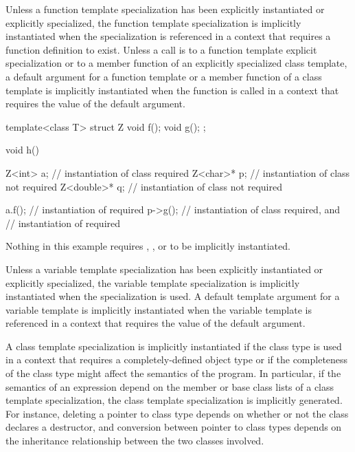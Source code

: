 \pnum
Unless a function template specialization has been explicitly instantiated or
explicitly specialized,
the function template specialization is implicitly instantiated when the
specialization is referenced in a context that requires a function definition
to exist.
Unless a call is to a function template explicit specialization or
to a member function of an explicitly specialized class template,
a default argument for a function template or a member function of a
class template is implicitly instantiated when the function is
called in a context that requires the value of the default argument.

\pnum
\enterexample
\begin{codeblock}
template<class T> struct Z {
  void f();
  void g();
};

void h() {
  Z<int> a;         // instantiation of class  required
  Z<char>* p;       // instantiation of class  not required
  Z<double>* q;     // instantiation of class  not required

  a.f();            // instantiation of  required
  p->g();           // instantiation of class  required, and
                    // instantiation of  required
}
\end{codeblock}

Nothing in this example requires
,
,
or
to be implicitly instantiated.
\exitexample

\pnum
Unless a variable template specialization has been explicitly instantiated or
explicitly specialized, the variable template specialization is implicitly
instantiated when the specialization is used. A default template argument for a
variable template is implicitly instantiated when the variable template is
referenced in a context that requires the value of the default argument.

\pnum
A class template specialization is implicitly instantiated if the
class type is used in a context that requires a completely-defined
object type or if the completeness of the class type might affect the
semantics of the program.
\enternote
In particular, if the semantics of an expression depend on the member
or base class lists of a class template specialization, the class
template specialization is implicitly generated. For instance,
deleting a pointer to class type depends on whether or not the class
declares a destructor, and conversion between pointer to class types
depends on the inheritance relationship between the two classes
involved.
\exitnote
\enterexample

